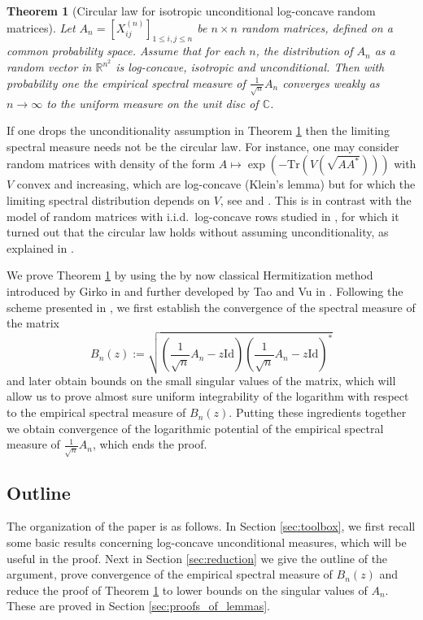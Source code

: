 \documentclass[12pt,reqno]{amsart}
\newtheorem{theorem}[lemma]{Theorem}
\begin{document}
\begin{theorem}[Circular law for isotropic unconditional log-concave random
  matrices]\label{thm:main}
  Let $A_n=[X_{ij}^{{(n)}}]_{1\leq i,j\le n}$ be $n\times n$ random matrices,
  defined on a common probability space. Assume that for each $n$, the
  distribution of $A_n$ as a random vector in ${\mathbb{R}}^{n^2}$ is log-concave,
  isotropic and unconditional. Then with probability one the empirical
  spectral measure of $\frac{1}{\sqrt{n}}A_n$ converges weakly as $n\to\infty$
  to the uniform measure on the unit disc of ${\mathbb{C}}$.
\end{theorem}

If one drops the unconditionality assumption in Theorem \ref{thm:main} then
the limiting spectral measure needs not be the circular law. For instance, one
may consider random matrices with density of the form
$A\mapsto\exp(-\mathrm{Tr}(V(\sqrt{AA^*})))$ with $V$ convex and increasing, which are
log-concave (Klein's lemma) but for which the limiting spectral distribution
depends on $V$, see \cite[eq.~(5.8) p.~654]{MR1477381} and \cite{MR2831116}.
This is in contrast with the model of random matrices with i.i.d.\ log-concave
rows studied in \cite{CircLawUnc}, for which it turned out that the circular
law holds without assuming unconditionality, as explained in \cite{InfoNoise}.

We prove Theorem \ref{thm:main} by using the by now classical Hermitization
method introduced by Girko in \cite{G1} and further developed by Tao and Vu in
\cite{TV}. Following the scheme presented in \cite{BCAround}, we first
establish the convergence of the spectral measure of the matrix
\begin{equation}\label{eq:defMnz}
  B_n(z):=\sqrt{\left(\frac{1}{\sqrt{n}}A_n-z{\mathrm{Id}}\right)\left(\frac{1}{\sqrt{n}}A_n-z{\mathrm{Id}}\right)^\ast}
\end{equation}
and later obtain bounds on the small singular values of the matrix, which will
allow us to prove almost sure uniform integrability of the logarithm with
respect to the empirical spectral measure of $B_n(z)$. Putting these
ingredients together we obtain convergence of the logarithmic potential of the
empirical spectral measure of $\frac{1}{\sqrt{n}} A_n$, which ends the proof.

\subsection*{Outline} The organization of the paper is as follows. In Section
\ref{sec:toolbox}, we first recall some basic results concerning log-concave
unconditional measures, which will be useful in the proof. Next in Section
\ref{sec:reduction} we give the outline of the argument, prove convergence of
the empirical spectral measure of $B_n(z)$ and reduce the proof of Theorem
\ref{thm:main} to lower bounds on the singular values of $A_n$. These are
proved in Section \ref{sec:proofs_of_lemmas}.
\end{document}

